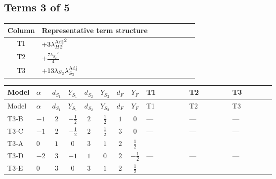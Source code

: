 \documentclass[8pt]{article}
\begin{document}
\begin{landscape}
\subsection*{Terms 3 of 5}
\begin{center}
\begin{tabular}{@{}c >{\raggedright\arraybackslash}p{0.82\linewidth}@{}}
\toprule
Column & Representative term structure \\
\midrule
T1 & \(\displaystyle +3 {\lambda_{H2}^{\rm Adj}}^2\) \\
\midrule
T2 & \(\displaystyle +\frac{7 {\lambda_{S_2}}^2}{4}\) \\
\midrule
T3 & \(\displaystyle +13 {\lambda_{S_2}} {\lambda_{S_2}^{\rm Adj}}\) \\
\midrule
\bottomrule
\end{tabular}
\end{center}
\smallskip
\tiny
\begin{longtable}{@{}llcccccc >{\raggedright\arraybackslash}p{0.21\linewidth} >{\raggedright\arraybackslash}p{0.21\linewidth} >{\raggedright\arraybackslash}p{0.21\linewidth}@{}}
\toprule
Model & $\alpha$ & $d_{S_1}$ & $Y_{S_1}$ & $d_{S_2}$ & $Y_{S_2}$ & $d_F$ & $Y_F$ & T1 & T2 & T3 \\
\midrule
\endfirsthead
\toprule
Model & $\alpha$ & $d_{S_1}$ & $Y_{S_1}$ & $d_{S_2}$ & $Y_{S_2}$ & $d_F$ & $Y_F$ & T1 & T2 & T3 \\
\midrule
\endhead
T3-B & $-1$ & $2$ & $-\frac{1}{2}$ & $2$ & $\frac{1}{2}$ & $1$ & $0$ & --- & --- & --- \\
\midrule
T3-C & $-1$ & $2$ & $-\frac{1}{2}$ & $2$ & $\frac{1}{2}$ & $3$ & $0$ & --- & --- & --- \\
\midrule
T3-A & $0$ & $1$ & $0$ & $3$ & $1$ & $2$ & $\frac{1}{2}$ & \scriptsize\adjustbox{max width=\linewidth}{$\begin{gathered} +3 {\lambda_{H2}^{\rm Adj}}^2\end{gathered}$} & \scriptsize\adjustbox{max width=\linewidth}{$\begin{gathered} +\frac{7 {\lambda_{S_2}}^2}{4}\end{gathered}$} & \scriptsize\adjustbox{max width=\linewidth}{$\begin{gathered} +13 {\lambda_{S_2}} {\lambda_{S_2}^{\rm Adj}}\end{gathered}$} \\
\midrule
T3-D & $-2$ & $3$ & $-1$ & $1$ & $0$ & $2$ & $-\frac{1}{2}$ & --- & --- & --- \\
\midrule
T3-E & $0$ & $3$ & $0$ & $3$ & $1$ & $2$ & $\frac{1}{2}$ & \scriptsize\adjustbox{max width=\linewidth}{$\begin{gathered} +3 {\lambda_{H2}^{\rm Adj}}^2\end{gathered}$} & \scriptsize\adjustbox{max width=\linewidth}{$\begin{gathered} +\frac{7 {\lambda_{S_2}}^2}{4}\end{gathered}$} & \scriptsize\adjustbox{max width=\linewidth}{$\begin{gathered} +13 {\lambda_{S_2}} {\lambda_{S_2}^{\rm Adj}}\end{gathered}$} \\

\end{longtable}
\end{landscape}
\end{document}
